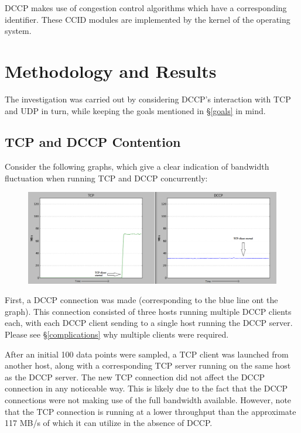 \documentclass[10pt,a4paper]{article}
\begin{document}
DCCP makes use of congestion control algorithms which have a corresponding identifier. These CCID modules are implemented by
the kernel of the operating system. 


\section{Methodology and Results}
The investigation was carried out by considering DCCP's interaction with TCP and UDP in turn, while keeping the goals mentioned in
\S\ref{goals} in mind.

\subsection{TCP and DCCP Contention}

Consider the following graphs, which give a clear indication of bandwidth fluctuation when running TCP and DCCP 
concurrently:


\begin{figure}[!h]
\begin{center}
\hspace*{-65pt}
\includegraphics[scale=.52]{screens/re/Screenshot-33.png}
\end{center}
\end{figure}

First, a DCCP connection was made (corresponding to the blue line ont the graph). This connection consisted of three hosts running multiple
DCCP clients each, with each DCCP client sending to a single host running the DCCP server. 
Please see \S\ref{complications} why multiple clients were required.

After an initial 100 data points were sampled, a TCP client was launched from another
host, along with a corresponding TCP server running on the same host as the DCCP server. The new TCP connection did not
affect the DCCP connection in any noticeable way. This is likely due to the fact that the DCCP connections were
not making use of the full bandwidth available. However, note that the TCP connection is running at a lower throughput
than the approximate 117 MB/s of which it can utilize in the absence of DCCP.
\end{document}
